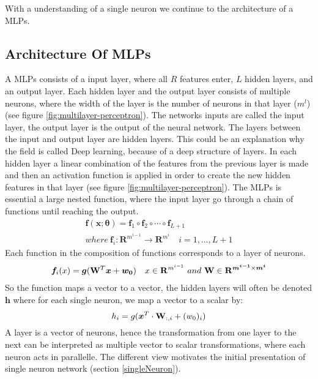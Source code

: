 With a understanding of a single neuron we continue to the architecture of a MLPs.


\subsection{Architecture Of MLPs}\label{architectureMLPs}
A MLPs consists of a input layer, where all $R$ features enter, $L$ hidden layers, and an output layer. Each hidden layer and the output layer consists of multiple neurons, where the width of the layer is the number of neurons in that layer ($m^l$) (see figure \ref{fig:multilayer-perceptron}). The networks inputs are called the input layer, the output layer is the output of the neural network. The layers between the input and output layer are hidden layers. This could be an explanation why the field is called Deep learning, because of a deep structure of layers. In each hidden layer a linear combination of the features from the previous layer is made and then an activation function is applied in order to create the new hidden features in that layer (see figure \ref{fig:multilayer-perceptron}). The MLPs is essential a large nested function, where the input layer go through a chain of functions until reaching the output.
\begin{align}
\bm{f}(\bm{x};\bm{\theta})=\bm{f}_1 \circ \bm{f}_2 \circ \cdots \circ \bm{f}_{L+1}\\
where \ \bm{f}_i : \mathbf{R}^{m^{i-1}} \to \mathbf{R}^{m^{i}} \quad i=1,\ldots, L+1
\end{align}
Each function in the composition of functions corresponds to a layer of neurons.
\begin{align}
\bm{f}_i(x)=\bm{g}(\mathbf{W}^T \bm{x} + \bm{w_0}) \quad x\in \mathbf{R}^{m^{i-1}} \ and \ \mathbf{W} \in \mathbf{R}^{\bm{m^{i-1}} \times \bm{m^{i}} }
\end{align}
So the function maps a vector to a vector, the hidden layers will often be denoted $\bm{h}$ where for each single neuron, we map a vector to a scalar by:
$$h_i=g(\bm{x}^T \cdot \mathbf{W}_{:,i} + (w_0)_{i})$$
A layer is a vector of neurons, hence the transformation from one layer to the next can be interpreted as multiple vector to scalar transformations, where each neuron acts in parallelle. The different view motivates the initial presentation of single neuron network (section \ref{singleNeuron}).

